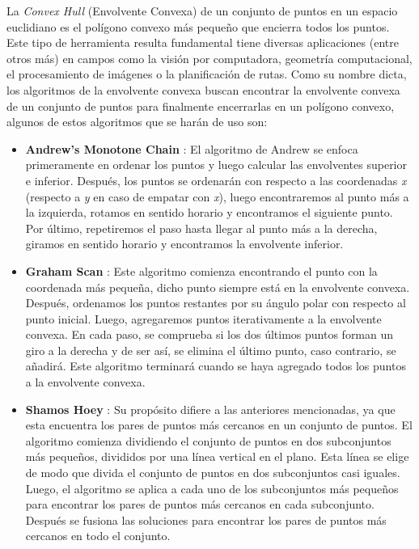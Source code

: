 \documentclass[conference]{IEEEtran}
\begin{document}
La \textit{Convex Hull} (Envolvente Convexa) \cite{convex_hull-art} de un conjunto de puntos en un espacio euclidiano \cite{euclidiano} es el polígono convexo \cite{poligono_convexo} más pequeño que encierra todos los puntos. Este tipo de herramienta resulta fundamental tiene diversas aplicaciones (entre otros más) en campos como la visión por computadora, geometría computacional, el procesamiento de imágenes o la planificación de rutas. Como su nombre dicta, los algoritmos de la envolvente convexa buscan encontrar la envolvente convexa de un conjunto de puntos para finalmente encerrarlas en un polígono convexo, algunos de estos algoritmos que se harán de uso son:
\begin{itemize}
    \item \textbf{Andrew's Monotone Chain} \cite{andrew_ch}: El algoritmo de Andrew se enfoca primeramente en ordenar los puntos y luego calcular las envolventes superior e inferior. Después, los puntos se ordenarán con respecto a las coordenadas \textit{x} (respecto a \textit{y} en caso de empatar con \textit{x}), luego encontraremos al punto más a la izquierda, rotamos en sentido horario y encontramos el siguiente punto. Por último, repetiremos el paso hasta llegar al punto más a la derecha, giramos en sentido horario y encontramos la envolvente inferior. 
    \item \textbf{Graham Scan} \cite{graham_ch}: Este algoritmo comienza encontrando el punto con la coordenada más pequeña, dicho punto siempre está en la envolvente convexa. Después, ordenamos los puntos restantes por su ángulo polar con respecto al punto inicial. Luego, agregaremos puntos iterativamente a la envolvente convexa. En cada paso, se comprueba si los dos últimos puntos forman un giro a la derecha y de ser así, se elimina el último punto, caso contrario, se añadirá. Este algoritmo terminará cuando se haya agregado todos los puntos a la envolvente convexa.
    \item \textbf{Shamos Hoey} \cite{shamos}: Su propósito difiere a las anteriores mencionadas, ya que esta encuentra los pares de puntos más cercanos en un conjunto de puntos. El algoritmo comienza dividiendo el conjunto de puntos en dos subconjuntos más pequeños, divididos por una línea vertical en el plano. Esta línea se elige de modo que divida el conjunto de puntos en dos subconjuntos casi iguales. Luego, el algoritmo se aplica a cada uno de los subconjuntos más pequeños para encontrar los pares de puntos más cercanos en cada subconjunto. Después se fusiona las soluciones para encontrar los pares de puntos más cercanos en todo el conjunto.
\end{itemize}
 
\end{document}
